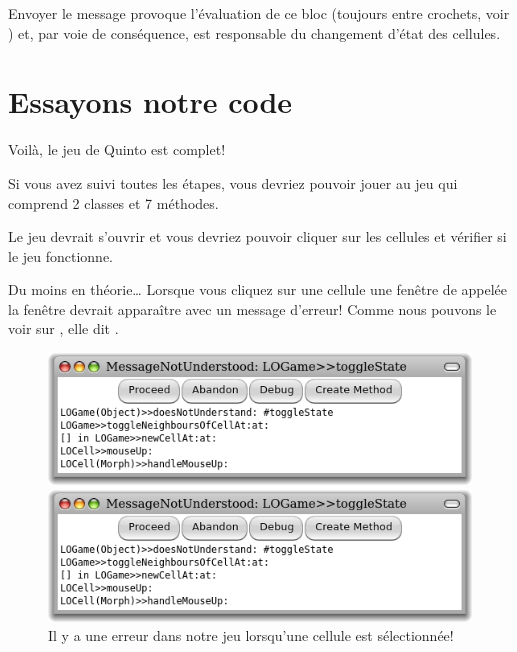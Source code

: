 \documentclass[a4paper,10pt,twoside]{book}
\begin{document}

\noindent
Envoyer le message  provoque l'évaluation de ce bloc
(toujours entre crochets, voir ) et, par voie de
conséquence, est responsable du changement d'état des cellules.

\section{Essayons notre code}

Voilà, le jeu de Quinto est complet!

Si vous avez suivi toutes les étapes, vous devriez pouvoir jouer au jeu qui comprend 2 classes et 7 méthodes.


Le jeu devrait s'ouvrir et vous devriez pouvoir cliquer sur les cellules et vérifier si le jeu fonctionne.

Du moins en théorie\ldots{}
Lorsque vous cliquez sur une cellule une fen\^etre de  appelée la fen\^etre  devrait apparaître avec un message d'erreur!
Comme nous pouvons le voir sur , elle dit .

\begin{figure}[ht]
\ifluluelse
	{\centerline{\includegraphics[width=\textwidth]{Error}}}
	{\centerline{\includegraphics[scale=0.7]{Error}}}
\caption{Il y a une erreur dans notre jeu lorsqu'une cellule est sélectionnée!
\label{fig:quintoError}}
\end{figure}
\end{document}
